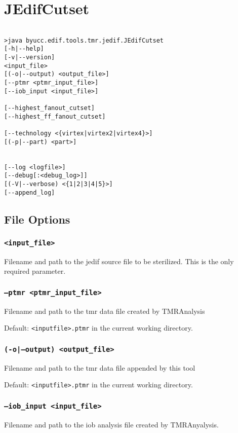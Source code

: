 \section{JEdifCutset}
\begin{verbatim}

>java byucc.edif.tools.tmr.jedif.JEdifCutset 
[-h|--help] 
[-v|--version] 
<input_file> 
[(-o|--output) <output_file>] 
[--ptmr <ptmr_input_file>] 
[--iob_input <input_file>] 

[--highest_fanout_cutset] 
[--highest_ff_fanout_cutset] 

[--technology <{virtex|virtex2|virtex4}>] 
[(-p|--part) <part>] 


[--log <logfile>] 
[--debug[:<debug_log>]] 
[(-V|--verbose) <{1|2|3|4|5}>] 
[--append_log]

\end{verbatim}
\subsection{File Options}

\subsubsection{\texttt{<input\_file>}}
Filename and path to the jedif source file to be
sterilized. This is the only required parameter.

\subsubsection{\texttt{--ptmr <ptmr\_input\_file>}}
Filename and path to the tmr data file created by TMRAnalysis

Default: \texttt{<inputfile>.ptmr} in the current working directory.

\subsubsection{\texttt{(-o|--output) <output\_file>}}
Filename and path to the tmr data file appended by this tool

Default: \texttt{<inputfile>.ptmr} in the current working directory.

\subsubsection{\texttt{--iob\_input <input\_file>}}
Filename and path to the iob analysis file created by TMRAnyalysis.

